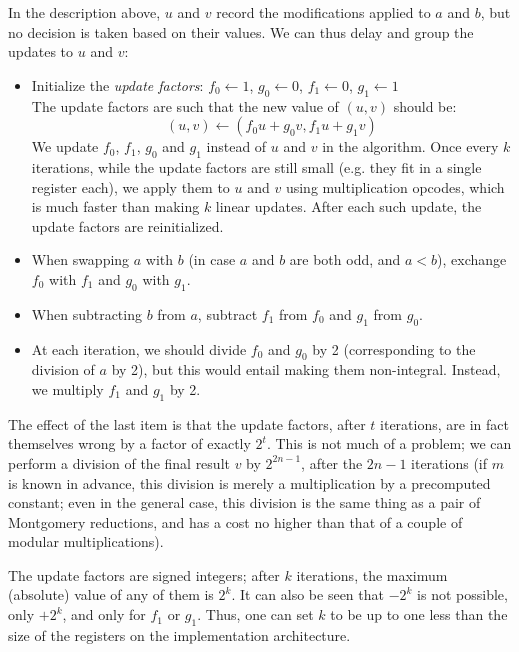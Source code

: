 \documentclass{llncs}
\begin{document}
In the description above, $u$ and $v$ record the modifications applied
to $a$ and $b$, but no decision is taken based on their values. We can
thus delay and group the updates to $u$ and $v$:
\begin{itemize}

    \item Initialize the \emph{update factors}:
    $f_0 \leftarrow 1$, $g_0 \leftarrow 0$,
    $f_1 \leftarrow 0$, $g_1 \leftarrow 1$ \\
    The update factors are such that the new value of $(u, v)$ should be:
    \begin{equation*}
        (u, v) \leftarrow (f_0 u + g_0 v, f_1 u + g_1 v)
    \end{equation*}
    We update $f_0$, $f_1$, $g_0$ and $g_1$ instead of $u$ and $v$ in
    the algorithm. Once every $k$ iterations, while the update factors
    are still small (e.g. they fit in a single register each), we apply
    them to $u$ and $v$ using multiplication opcodes, which is much
    faster than making $k$ linear updates. After each such update, the
    update factors are reinitialized.

    \item When swapping $a$ with $b$ (in case $a$ and $b$ are both odd,
    and $a < b$), exchange $f_0$ with $f_1$ and $g_0$ with $g_1$.

    \item When subtracting $b$ from $a$, subtract $f_1$ from $f_0$ and
    $g_1$ from $g_0$.

    \item At each iteration, we should divide $f_0$ and $g_0$ by 2
    (corresponding to the division of $a$ by 2), but this would entail
    making them non-integral. Instead, we multiply $f_1$ and $g_1$ by 2.

\end{itemize}

The effect of the last item is that the update factors, after $t$
iterations, are in fact themselves wrong by a factor of exactly $2^t$.
This is not much of a problem; we can perform a division of the final
result $v$ by $2^{2n-1}$, after the $2n-1$ iterations (if $m$ is known
in advance, this division is merely a multiplication by a precomputed
constant; even in the general case, this division is the same thing as a
pair of Montgomery reductions, and has a cost no higher than that of a
couple of modular multiplications).

The update factors are signed integers; after $k$ iterations, the
maximum (absolute) value of any of them is $2^k$. It can also be seen
that $-2^k$ is not possible, only $+2^k$, and only for $f_1$ or $g_1$.
Thus, one can set $k$ to be up to one less than the size of the
registers on the implementation architecture.
\end{document}
